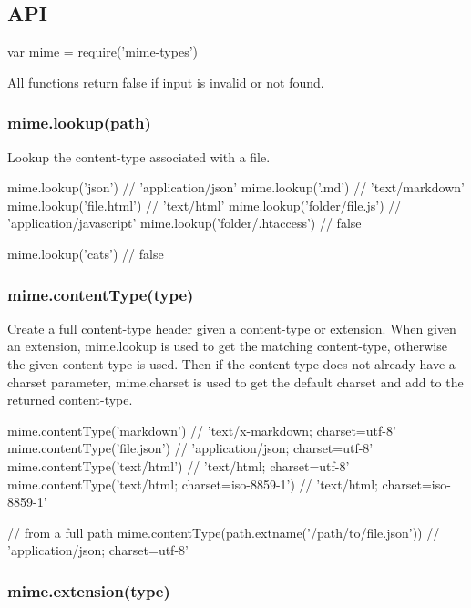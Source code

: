 \subsection*{A\+PI}


\begin{DoxyCode}
var mime = require('mime-types')
\end{DoxyCode}


All functions return {\ttfamily false} if input is invalid or not found.

\subsubsection*{mime.\+lookup(path)}

Lookup the content-\/type associated with a file.


\begin{DoxyCode}
mime.lookup('json')             // 'application/json'
mime.lookup('.md')              // 'text/markdown'
mime.lookup('file.html')        // 'text/html'
mime.lookup('folder/file.js')   // 'application/javascript'
mime.lookup('folder/.htaccess') // false

mime.lookup('cats') // false
\end{DoxyCode}


\subsubsection*{mime.\+content\+Type(type)}

Create a full content-\/type header given a content-\/type or extension. When given an extension, {\ttfamily mime.\+lookup} is used to get the matching content-\/type, otherwise the given content-\/type is used. Then if the content-\/type does not already have a {\ttfamily charset} parameter, {\ttfamily mime.\+charset} is used to get the default charset and add to the returned content-\/type.


\begin{DoxyCode}
mime.contentType('markdown')  // 'text/x-markdown; charset=utf-8'
mime.contentType('file.json') // 'application/json; charset=utf-8'
mime.contentType('text/html') // 'text/html; charset=utf-8'
mime.contentType('text/html; charset=iso-8859-1') // 'text/html; charset=iso-8859-1'

// from a full path
mime.contentType(path.extname('/path/to/file.json')) // 'application/json; charset=utf-8'
\end{DoxyCode}


\subsubsection*{mime.\+extension(type)}


